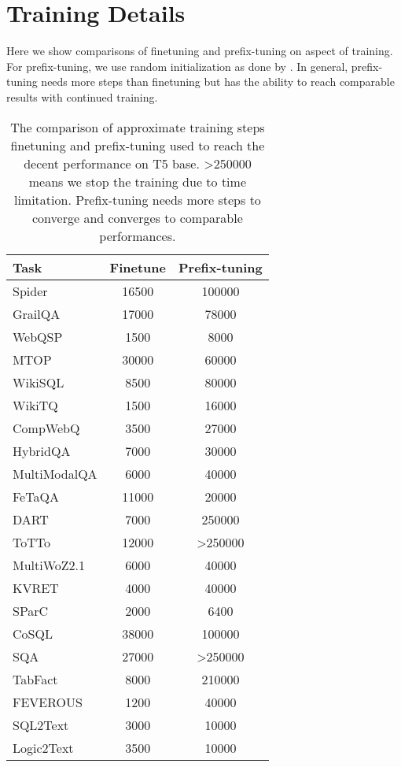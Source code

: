 \documentclass[11pt]{article}
\begin{document}
\section{Training Details}
\label{app:step}
Here we show comparisons of finetuning and prefix-tuning on aspect of training.
For prefix-tuning, we use random initialization as done by \citet{li2021prefixtuning}.
In general, prefix-tuning needs more steps than finetuning but has the ability to reach comparable results with continued training.
\begin{table}[t]
	\centering
	\small
	\begin{adjustbox}{width=0.7\linewidth}
		\begin{tabular}{@{}lcc@{}}
		    \toprule
			Task & Finetune & Prefix-tuning  \\
			\midrule
			Spider & 16500 & 100000 \\
            GrailQA  & 17000 & 78000 \\
            WebQSP  & 1500 & 8000 \\
            MTOP  & 30000 & 60000\\
			WikiSQL  & 8500 & 80000 \\
            WikiTQ  & 1500 & 16000\\
            CompWebQ  & 3500 & 27000 \\
            HybridQA  & 7000 & 30000 \\
            MultiModalQA & 6000 & 40000 \\
            FeTaQA & 11000 & 20000 \\
			DART  & 7000 & 250000 \\
			ToTTo & 12000 & >250000 \\
			MultiWoZ2.1 & 6000 & 40000 \\
			KVRET  & 4000 & 40000 \\
			SParC  & 2000 & 6400 \\
			CoSQL & 38000 & 100000 \\
			SQA & 27000 & >250000\\
			TabFact & 8000 & 210000 \\
			FEVEROUS  & 1200 & 40000 \\
			SQL2Text & 3000 & 10000 \\
			Logic2Text & 3500 & 10000\\
			\bottomrule
		\end{tabular}
	\end{adjustbox}
	\caption{The comparison of approximate training steps finetuning and prefix-tuning used to reach the decent performance on T5 base. >250000 means we stop the training due to time limitation. Prefix-tuning needs more steps to converge and converges to comparable performances.}
	\label{tab:steps_comparison}
\end{table}  
\end{document}
